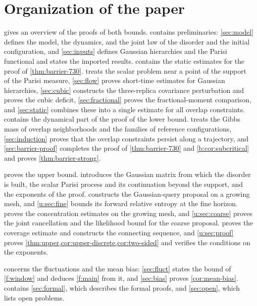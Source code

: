 \section{Organization of the paper}\label{sec:intro-organization}

 gives an overview of the proofs of both bounds.
 contains preliminaries: \cref{sec:model} defines the model,
the dynamics, and the joint law of the disorder and the initial
configuration, and \cref{sec:inputs} defines Gaussian hierarchies and the
Parisi functional and states the imported results. 
contains the static estimates for the proof of \cref{thm:barrier-730}.
 treats the scalar
problem near a point of the support of the Parisi measure,
\cref{sec:flow} proves short-time estimates for Gaussian hierarchies,
\cref{sec:cubic} constructs the three-replica covariance perturbation and
proves the cubic deficit, \cref{sec:fractional} proves the fractional-moment
comparison, and \cref{sec:static} combines these into a single estimate for
all overlap constraints.  contains the dynamical part of
the proof of the lower bound.  treats the Gibbs mass of
overlap neighborhoods and the families of reference configurations,
\cref{sec:induction} proves that the overlap constraints persist along a
trajectory, and \cref{sec:barrier-proof} completes the proof of
\cref{thm:barrier-730} and \cref{b:cor:subcritical} and proves
\cref{thm:barrier-strong}.

 proves the upper bound.  introduces the
Gaussian matrix from which the disorder is built, the scalar Parisi process
and its continuation beyond the support, and the exponents of the proof.
 constructs the Gaussian-query proposal on a growing
mesh, and \cref{u:sec:fine} bounds its forward relative entropy at the fine
horizon.  proves the concentration estimates on the
growing mesh, and \cref{u:sec:coarse} proves the joint cancellation and the
likelihood bound for the coarse proposal.  proves the
coverage estimate and constructs the connecting sequence, and
\cref{u:sec:proof} proves \cref{thm:upper,cor:upper-discrete,cor:two-sided}
and verifies the conditions on the exponents.

 concerns the fluctuations and the mean bias:
\cref{sec:fluct} states the bound of \cref{f:window} and deduces
\cref{f:main} from it, and \cref{sec:bias} proves \cref{cor:mean-bias}.
 contains \cref{sec:formal}, which describes the formal
proofs, and \cref{sec:open}, which lists open problems.
